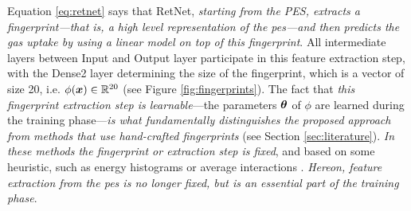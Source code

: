 Equation \ref{eq:retnet} says that RetNet, \emph{starting from the PES,
extracts a fingerprint---that is, a high level
representation of the \gls{pes}---and then
predicts the gas uptake by using a linear model on top of this fingerprint}. All
intermediate layers between Input and Output layer
participate in this feature extraction step, with the Dense\num{2} layer
determining the size of the fingerprint, which is a vector of size \num{20},
i.e. $\phi(\boldsymbol{x}) \in \mathbb{R}^{20}$ (see Figure \ref{fig:fingerprints}). The
fact that \emph{this fingerprint extraction step
is learnable}---the parameters $\boldsymbol{\theta}$ of $\phi$ are learned during the training
phase---\emph{is what fundamentally distinguishes the
proposed approach from methods that use hand-crafted
fingerprints} (see Section
\ref{sec:literature}). \emph{In these methods the fingerprint or
extraction step is fixed}, and based on some
heuristic, such as energy histograms \parencite{bucior} or average interactions
\parencite{generic}. \emph{Hereon, feature extraction from the \gls{pes} is no
longer fixed, but is an essential part of the training phase}.

